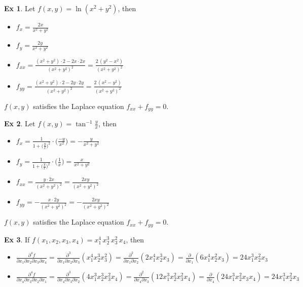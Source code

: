\documentclass[12pt]{extarticle}
\newcommand{\ds}{\displaystyle}
\theoremstyle{definition}
\newtheorem*{ex}{Ex}
\newcommand{\pdiff}[2]{\frac{\partial #1}{\partial #2}}
\begin{document}
\begin{ex}
  Let $\ds f(x,y) = \ln(x^2 + y^2)$, then
  \begin{multicols}{2}
    \begin{itemize}\setlength{\itemsep}{0pt}
      \item $\ds f_x = \frac{2x}{x^2 + y^2}$ 
      \item $\ds f_y = \frac{2y}{x^2 + y^2}$ 
      \item $\ds f_{xx} = \frac{(x^2 + y^2)\cdot 2 - 2x\cdot 2x}{(x^2 + y^2)^2} = \frac{2\,(y^2 - x^2)}{(x^2 + y^2)^2}$
      \item $\ds f_{yy} = \frac{(x^2 + y^2)\cdot 2 - 2y\cdot 2y}{(x^2 + y^2)^2} = \frac{2\,(x^2 - y^2)}{(x^2 + y^2)^2}$
    \end{itemize}
  \end{multicols}
  $\ds f(x, y)$ satisfies the Laplace equation $\ds f_{xx} + f_{yy} = 0$. 
\end{ex}

\begin{ex}
  Let $\ds f(x,y) = \tan^{-1}\frac{y}{x}$, then
  \begin{multicols}{2}
    \begin{itemize}\setlength{\itemsep}{0pt}
      \item $\ds f_x = \frac{1}{1 + \big(\frac{y}{x}\big)^2}\cdot\bigg(\frac{-y}{x^2}\bigg) = -\frac{y}{x^2 + y^2}$ 
      \item $\ds f_y = \frac{1}{1 + \big(\frac{y}{x}\big)^2}\cdot\bigg(\frac{1}{x}\bigg) = \frac{x}{x^2 + y^2}$ 
      \item $\ds f_{xx} = \frac{y\cdot 2x}{(x^2 + y^2)^2} = \frac{2 x y}{(x^2 + y^2)^2}$
      \item $\ds f_{yy} = -\frac{x\cdot 2y}{(x^2 + y^2)^2} = -\frac{2 x y}{(x^2 + y^2)^2}$
    \end{itemize}
  \end{multicols}
  $\ds f(x, y)$ satisfies the Laplace equation $\ds f_{xx} + f_{yy} = 0$. 
\end{ex}

\begin{ex}
  If $\ds f(x_1,x_2,x_3,x_4) = x_1^4\, x_2^3\, x_3^2\, x_4$, then
  \begin{itemize}\setlength{\itemsep}{0pt}
    \item $\ds\frac{\partial^4 f}{\partial x_1\partial x_2\partial x_3\partial x_4} = \frac{\partial^3}{\partial x_1\partial x_2\partial x_3}\left(x_1^4 x_2^3 x_3^2\right) = \frac{\partial^2}{\partial x_1\partial x_2}\left(2 x_1^4 x_2^3 x_3\right) = \pdiff{}{x_1}\left(6 x_1^4 x_2^2 x_3\right) = 24 x_1^3 x_2^2 x_3$ 
    \item $\ds\frac{\partial^4 f}{\partial x_4\partial x_3\partial x_2\partial x_1} = \frac{\partial^3}{\partial x_4\partial x_3\partial x_2}\left(4 x_1^3 x_2^3 x_3^2 x_4\right) = \frac{\partial^2}{\partial x_4\partial x_3}\left(12 x_1^3 x_2^2 x_3^2 x_4\right) = \pdiff{}{x_4}\left(24 x_1^3 x_2^2 x_3 x_4\right) =  24 x_1^3 x_2^2 x_3$
  \end{itemize}
\end{ex}
\end{document}
